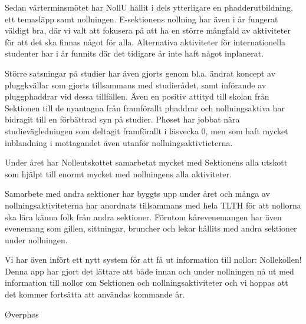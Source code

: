 \documentclass[../_main/handlingar.tex]{subfiles}
\begin{document}

Sedan vårterminsmötet har NollU hållit i dels ytterligare en phadderutbildning, ett temasläpp samt nollningen. E-sektionens nollning har även i år fungerat väldigt bra, där vi valt att fokusera på att ha en större mångfald av aktiviteter för att det ska finnas något för alla. Alternativa aktiviteter för internationella studenter har i år funnits där det tidigare år inte haft något inplanerat.

Större satsningar på studier har även gjorts genom bl.a. ändrat koncept av pluggkvällar som gjorts tillsammans med studierådet, samt införande av pluggphaddrar vid dessa tillfällen. Även en positiv attityd till skolan från Sektionen till de nyantagna från framförallt phaddrar och nollningsaktiva har bidragit till en förbättrad syn på studier. Phøset har jobbat nära studievägledningen som deltagit framförallt i läsvecka 0, men som haft mycket inblandning i mottagandet även utanför nollningsaktivtieterna.

Under året har Nolleutskottet samarbetat mycket med Sektionens alla utskott som hjälpt till enormt mycket med nollningens alla aktiviteter.

Samarbete med andra sektioner har byggts upp under året och många av nollningsaktiviteterna har anordnats tillsammans med hela TLTH för att nollorna ska lära känna folk från andra sektioner. Förutom kårevenemangen har även evenemang som gillen, sittningar, bruncher och lekar hållits med andra sektioner under nollningen.

Vi har även infört ett nytt system för att få ut information till nollor: Nollekollen! Denna app har gjort det lättare att både innan och under nollningen nå ut med information till nollor om Sektionen och nollningsaktiviteter och vi hoppas att det kommer fortsätta att användas kommande år.

\begin{signatures}{1}
    \mvh
    \signature{Molly Liljebjörn Rusk}{Øverphøs}
\end{signatures}
\end{document}
